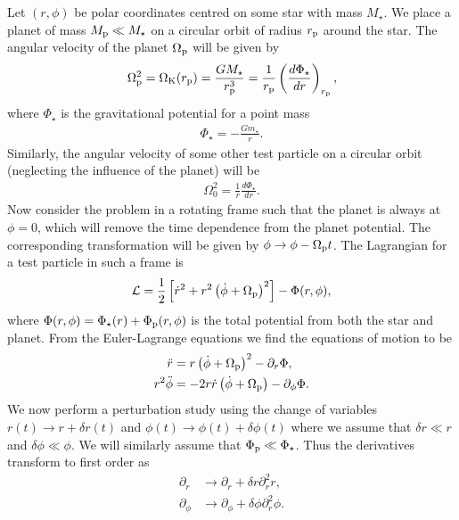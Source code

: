 Let $(r,\phi)$ be polar coordinates centred on some star with mass $M_\star$.
We place a planet of mass $M_{\rm p} \ll M_\star$ on a circular orbit of radius $r_{\rm p}$ around the star.
The angular velocity of the planet $\Omega_{\rm p}$ will be given by 
\begin{align}
    \Omega_{\rm p}^2 = \Omega_{\rm K}(r_{\rm p}) = \frac{G M_\star}{r_{\rm p}^3} = \frac{1}{r_{\rm p}} \left( \frac{d\Phi_\star}{dr} \right) _{r_{\rm p}},
\end{align}
where $\Phi_\star$ is the gravitational potential for a point mass
\begin{align}
    \Phi_\star = - \frac{G m_\star}{r}.
\end{align}
Similarly, the angular velocity of some other test particle on a circular orbit (neglecting the influence of the planet) will be
\begin{align}
    \Omega_0^2 = \frac{1}{r} \frac{d\Phi_\star}{dr}.
\end{align}
Now consider the problem in a rotating frame such that the planet is always at $\phi=0$, which will remove the time dependence from the planet potential. 
The corresponding transformation will be given by $\phi \rightarrow \phi - \Omega_{\rm p} t$.
The Lagrangian for a test particle in such a frame is
\begin{align}
    \mathcal{L} = \frac{1}{2} \left[ \dot{r}^2 + r^2 \left( \dot{\phi} + \Omega_{\rm p}  \right)^2 \right] - \Phi (r, \phi),
\end{align}
where $\Phi (r,\phi) = \Phi_\star (r) + \Phi_{\rm p} (r, \phi)$ is the total potential from both the star and planet.
From the Euler-Lagrange equations we find the equations of motion to be
\begin{align}
    \ddot{r} &= r \left( \dot{\phi} + \Omega_{\rm p} \right)^2 - \partial_r \Phi, \label{eq:EOM_rad} \\
    r^2 \ddot{\phi} &= - 2 r \dot{r} \left( \dot{\phi} + \Omega_{\rm p}  \right) - \partial_\phi \Phi. \label{eq:EOM_az}
\end{align}
We now perform a perturbation study using the change of variables $r(t) \rightarrow r + \delta r (t)$  and $\phi (t) \rightarrow \phi (t) + \delta \phi (t)$ where we assume that $\delta r \ll r$ and $\delta \phi \ll \phi$.
We will similarly assume that $\Phi_{\rm p} \ll \Phi_\star$.
Thus the derivatives transform to first order as
\begin{align}
    \partial_r &\rightarrow \partial_r + \delta r \partial_r^2 r, \\
    \partial_\phi &\rightarrow \partial_\phi + \delta \phi \partial_r^2 \phi.
\end{align}
